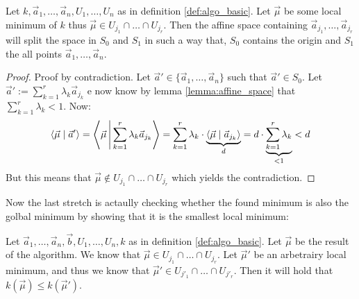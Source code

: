 \begin{lemma}
    \label{lemma:local_minimum_faces_is_visible_from_origin}
    Let $k, \vec a_1, \dots, \vec a_n, U_1, \dots, U_n$ as in definition \ref{def:algo_basic}. Let $\vec\mu$ be some local minimum of $k$ thus $\vec\mu \in U_{j_1}\cap \dots \cap U_{j_r}$. Then the affine space containing $\vec a_{j_1}, \dots, \vec a_{j_r}$ will split the space in $S_0$ and $S_1$ in such a way that, $S_0$ contains the origin and $S_1$ the all points $\vec a_1, \dots, \vec a_n$.
\end{lemma}
\begin{proof}
    Proof by contradiction. Let $\vec a' \in \{\vec a_1, \dots, \vec a_n\}$ such that $\vec a' \in S_0$. Let $\vec a' := \sum_{k=1}^r \lambda_k \vec a_{j_k}$ e now know by lemma \ref{lemma:affine_space} that $\sum_{k=1}^r \lambda_k < 1$.
    Now:
    $$\langle \vec\mu \mid \vec a' \rangle = \left\langle \vec\mu \,\middle|\, \sum_{k=1}^r \lambda_k \vec a_{j_k} \right\rangle = \sum_{k=1}^r\lambda_k \cdot \underbrace{\langle \vec\mu \mid \vec a_{j_k} \rangle}_d = d\cdot \underbrace{\sum_{k=1}^r\lambda_k}_{< 1} < d$$
    But this means that $\vec\mu \notin U_{j_1}\cap \dots \cap U_{j_r}$ which yields the contradiction.
\end{proof}
Now the last stretch is actaully checking whether the found minimum is also the golbal minimum by showing that it is the smallest local minimum:
\begin{lemma}
    Let $\vec a_1, \dots, \vec a_n, \vec b, U_1, \dots, U_n, k$ as in definition \ref{def:algo_basic}. Let $\vec \mu$ be the result of the algorithm. We know that $\vec\mu \in U_{j_1} \cap \dots \cap U_{j_r}$. Let $\vec\mu'$ be an arbetrairy local minimum, and thus we know that $\vec\mu' \in U_{j'_1} \cap \dots \cap U_{j'_r}$. Then it will hold that $k(\vec\mu) \leq k(\vec\mu')$.
\end{lemma}

